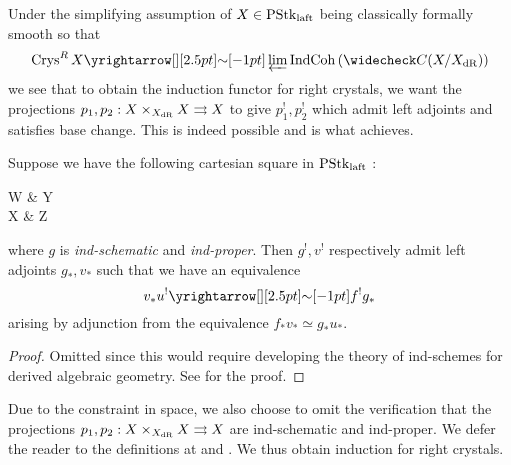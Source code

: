 \documentclass[./main.tex]{subfiles}
\begin{document}
Under the simplifying assumption of 
$X \in \mathrm{PStk}_{\mathrm{laft}}$ being classically formally smooth so that
\[
  \CRYS^R\,X \map{\sim}{} \LIM \INDCOH\brkt{\check{C}(X / X_\DR)}
\]
we see that to obtain the induction functor for right crystals, 
we want the projections 
$p_1, p_2 : X \times_{X_{\mathrm{dR}}} X \rightrightarrows X$ to give
$p_1^! , p_2^!$ which admit left adjoints and satisfies base change.
This is indeed possible and is what \cite[Ch 3, 2.1]{GR2} achieves.

\begin{prop}
  
  Suppose we have the following cartesian square in $\mathrm{PStk}_{\mathrm{laft}}$ : 
  \begin{cd}
    W & Y \\
    X & Z
    \arrow["v"{description}, from=1-1, to=2-1]
    \arrow["g"{description}, from=1-2, to=2-2]
    \arrow["f"{description}, from=2-1, to=2-2]
    \arrow["u"{description}, from=1-1, to=1-2]
    \arrow["\lrcorner"{anchor=center, pos=0.125}, draw=none, from=1-1, to=2-2]
  \end{cd}
  where $g$ is \emph{ind-schematic} and \emph{ind-proper}.
  Then $g^!, v^!$ respectively admit left adjoints $g_* , v_*$ such that
  we have an equivalence \[
    v_* u^! \map{\sim}{} f^! g_*
  \]
  arising by adjunction from the equivalence $f_* v_* \simeq g_* u_*$.
\end{prop}
\begin{proof}
  Omitted since this would require developing
  the theory of ind-schemes for derived algebraic geometry.
  See \cite[Ch 3, 2.1]{GR2} for the proof.
\end{proof}

Due to the constraint in space,
we also choose to omit the verification that
the projections $p_1, p_2 : X \times_{X_{\mathrm{dR}}} X \rightrightarrows X$ are 
ind-schematic and ind-proper.
We defer the reader to the definitions at 
\cite[Ch 2, 1.6.5]{GR2} and \cite[Ch 2, 1.6.11]{GR2}.
We thus obtain induction for right crystals.
\end{document}
